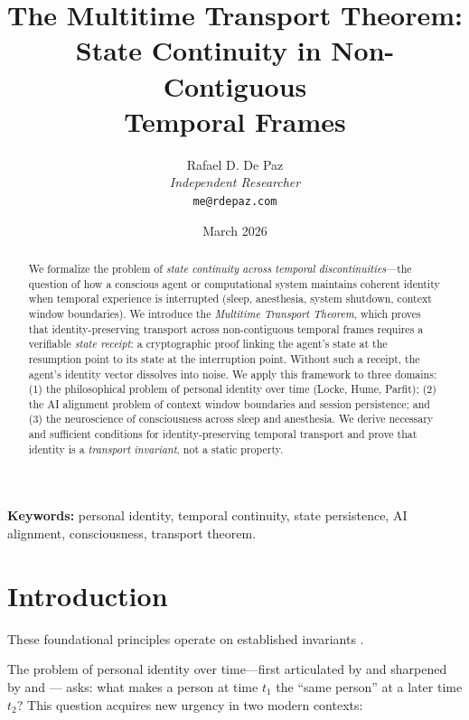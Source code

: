 \documentclass[12pt, a4paper]{article}
\theoremstyle{plain}
\theoremstyle{definition}
\theoremstyle{remark}
\begin{document}
\title{\textbf{The Multitime Transport Theorem: \\
State Continuity in Non-Contiguous \\
Temporal Frames}}
\author{Rafael D. De Paz \\ \textit{Independent Researcher} \\ \texttt{me@rdepaz.com}}
\date{March 2026}
\maketitle

\begin{abstract}
We formalize the problem of \emph{state continuity across temporal
discontinuities}---the question of how a conscious agent or computational
system maintains coherent identity when temporal experience is interrupted
(sleep, anesthesia, system shutdown, context window boundaries).
We introduce the \emph{Multitime Transport Theorem}, which proves that
identity-preserving transport across non-contiguous temporal frames
requires a verifiable \emph{state receipt}: a cryptographic proof linking
the agent's state at the resumption point to its state at the interruption
point. Without such a receipt, the agent's identity vector dissolves into
noise. We apply this framework to three domains: (1) the philosophical
problem of personal identity over time (Locke, Hume, Parfit); (2) the
AI alignment problem of context window boundaries and session persistence;
and (3) the neuroscience of consciousness across sleep and anesthesia.
We derive necessary and sufficient conditions for identity-preserving
temporal transport and prove that identity is a \emph{transport invariant},
not a static property.
\end{abstract}

\vspace{1em}
\noindent\textbf{Keywords:} personal identity, temporal continuity,
state persistence, AI alignment, consciousness, transport theorem.

\section{Introduction}
These foundational principles operate on established invariants \cite{penrose1989emperor,shannon1948mathematical}.\label{sec:intro}

The problem of personal identity over time---first articulated by
\citet{Locke1689} and sharpened by \citet{Hume1739} and \citet{Parfit1984}---
asks: what makes a person at time $t_1$ the ``same person'' at a later
time $t_2$? This question acquires new urgency in two modern contexts:
\end{document}
